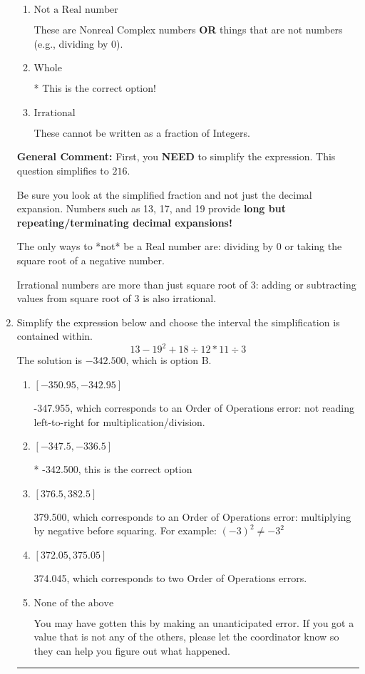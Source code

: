 \documentclass{extbook}[14pt]
\newcommand{\litem}[1]{\item #1

\rule{\textwidth}{0.4pt}}
\begin{document}
\begin{enumerate}
{\begin{enumerate}[label=\Alph*.]
These are numbers that can be written as fraction of Integers (e.g., -2/3)
\item \( \text{Not a Real number} \)

These are Nonreal Complex numbers \textbf{OR} things that are not numbers (e.g., dividing by 0).
\item \( \text{Whole} \)

* This is the correct option!
\item \( \text{Irrational} \)

These cannot be written as a fraction of Integers.
\end{enumerate}

\textbf{General Comment:} First, you \textbf{NEED} to simplify the expression. This question simplifies to $216$. 
 
 Be sure you look at the simplified fraction and not just the decimal expansion. Numbers such as 13, 17, and 19 provide \textbf{long but repeating/terminating decimal expansions!} 
 
 The only ways to *not* be a Real number are: dividing by 0 or taking the square root of a negative number. 
 
 Irrational numbers are more than just square root of 3: adding or subtracting values from square root of 3 is also irrational.
}
\litem{
Simplify the expression below and choose the interval the simplification is contained within.
\[ 13 - 19^2 + 18 \div 12 * 11 \div 3 \]
The solution is \( -342.500 \), which is option B.\begin{enumerate}[label=\Alph*.]
\item \( [-350.95, -342.95] \)

 -347.955, which corresponds to an Order of Operations error: not reading left-to-right for multiplication/division.
\item \( [-347.5, -336.5] \)

* -342.500, this is the correct option
\item \( [376.5, 382.5] \)

 379.500, which corresponds to an Order of Operations error: multiplying by negative before squaring. For example: $(-3)^2 \neq -3^2$
\item \( [372.05, 375.05] \)

 374.045, which corresponds to two Order of Operations errors.
\item \( \text{None of the above} \)

 You may have gotten this by making an unanticipated error. If you got a value that is not any of the others, please let the coordinator know so they can help you figure out what happened.
\end{enumerate}

}
\end{enumerate}
\end{document}
